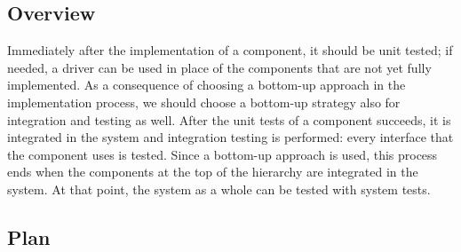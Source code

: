 \documentclass[../../main.tex]{subfiles}
\begin{document}
\subsection{Overview}

Immediately after the implementation of a component, it should be unit tested; if needed, a driver can be used in place of the components that are not yet fully implemented. 
As a consequence of choosing a bottom-up approach in the implementation process, we should choose a bottom-up strategy also for integration and testing as well. 
After the unit tests of a component succeeds, it is integrated in the system and integration testing is performed: every interface that the component uses is tested. Since a bottom-up approach is used, this process ends when the components at the top of the hierarchy are integrated in the system.
At that point, the system as a whole can be tested with system tests.

\subsection{Plan}
\end{document}
